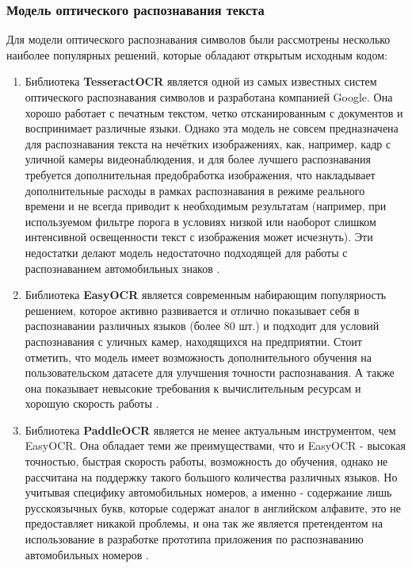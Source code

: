 \documentclass[a4paper,12pt]{article}
\begin{document}
\subsubsection{Модель оптического распознавания текста}

Для модели оптического распознавания символов были рассмотрены несколько наиболее популярных решений, которые обладают открытым исходным кодом:
\begin{enumerate}
    \item Библиотека \textbf{TesseractOCR} является одной из самых известных систем оптического распознавания символов и разработана компанией Google. Она хорошо работает с печатным текстом, четко отсканированным с документов и воспринимает различные языки. Однако эта модель не совсем предназначена для распознавания текста на нечётких изображениях, как, например, кадр с уличной камеры видеонаблюдения, и для более лучшего распознавания требуется дополнительная предобработка изображения, что накладывает дополнительные расходы в рамках распознавания в режиме реального времени и не всегда приводит к необходимым результатам (например, при используемом фильтре порога в условиях низкой или наоборот слишком интенсивной освещенности текст с изображения может исчезнуть). Эти недостатки делают модель недостаточно подходящей для работы с распознаванием автомобильных знаков \cite{tesseractocr}.
    \item Библиотека \textbf{EasyOCR} является современным набирающим популярность решением, которое активно развивается и отлично показывает себя в распознавании различных языков (более 80 шт.) и подходит для условий распознавания с уличных камер, находящихся на предприятии. Стоит отметить, что модель имеет возможность дополнительного обучения на пользовательском датасете для улучшения точности распознавания. А также она показывает невысокие требования к вычислительным ресурсам и хорошую скорость работы \cite{easyocr}.
    \item Библиотека \textbf{PaddleOCR} является не менее актуальным инструментом, чем EasyOCR. Она обладает теми же преимуществами, что и EasyOCR - высокая точностью, быстрая скорость работы, возможность до обучения, однако не рассчитана на поддержку такого большого количества различных языков. Но учитывая специфику автомобильных номеров, а именно - содержание лишь русскоязычных букв, которые содержат аналог в английском алфавите, это не предоставляет никакой проблемы, и она так же является претендентом на использование в разработке прототипа приложения по распознаванию автомобильных номеров \cite{paddleocr}.
\end{enumerate}
\end{document}
